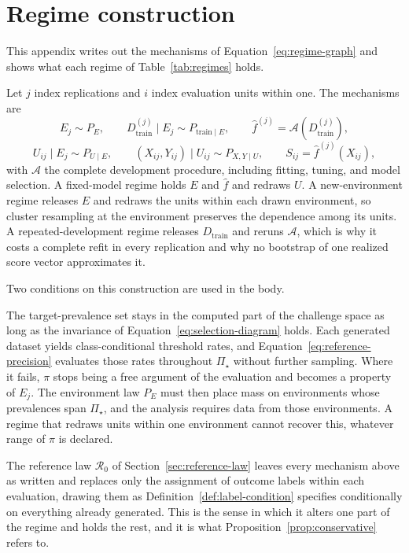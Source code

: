 \documentclass[11pt]{article}
\newcommand{\Regime}{\mathcal{R}}
\newcommand{\PSet}{\Pi_\star}
\theoremstyle{remark}
\begin{document}
\section{Regime construction}
\label{app:regime}

This appendix writes out the mechanisms of Equation~\eqref{eq:regime-graph} and shows what each regime of Table~\ref{tab:regimes} holds.

Let $j$ index replications and $i$ index evaluation units within one. The mechanisms are
\[
E_j\sim P_E,
\qquad
D_{\mathrm{train}}^{(j)}\mid E_j\sim P_{\mathrm{train}\mid E},
\qquad
\widehat f^{(j)}=\mathcal{A}\!\left(D_{\mathrm{train}}^{(j)}\right),
\]
\[
U_{ij}\mid E_j\sim P_{U\mid E},
\qquad
(X_{ij},Y_{ij})\mid U_{ij}\sim P_{X,Y\mid U},
\qquad
S_{ij}=\widehat f^{(j)}(X_{ij}),
\]
with $\mathcal{A}$ the complete development procedure, including fitting, tuning, and model selection. A fixed-model regime holds $E$ and $\widehat f$ and redraws $U$. A new-environment regime releases $E$ and redraws the units within each drawn environment, so cluster resampling at the environment preserves the dependence among its units. A repeated-development regime releases $D_{\mathrm{train}}$ and reruns $\mathcal{A}$, which is why it costs a complete refit in every replication and why no bootstrap of one realized score vector approximates it.

Two conditions on this construction are used in the body.

The target-prevalence set stays in the computed part of the challenge space as long as the invariance of Equation~\eqref{eq:selection-diagram} holds. Each generated dataset yields class-conditional threshold rates, and Equation~\eqref{eq:reference-precision} evaluates those rates throughout $\PSet$ without further sampling. Where it fails, $\pi$ stops being a free argument of the evaluation and becomes a property of $E_j$. The environment law $P_E$ must then place mass on environments whose prevalences span $\PSet$, and the analysis requires data from those environments. A regime that redraws units within one environment cannot recover this, whatever range of $\pi$ is declared.

The reference law $\Regime_0$ of Section~\ref{sec:reference-law} leaves every mechanism above as written and replaces only the assignment of outcome labels within each evaluation, drawing them as Definition~\ref{def:label-condition} specifies conditionally on everything already generated. This is the sense in which it alters one part of the regime and holds the rest, and it is what Proposition~\ref{prop:conservative} refers to.
\end{document}

